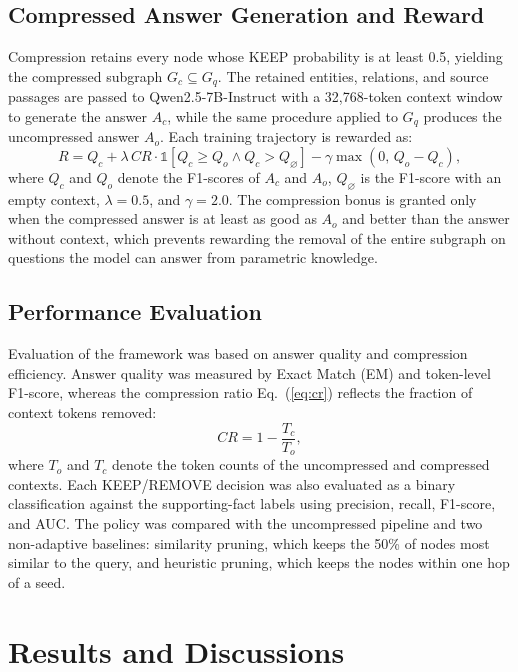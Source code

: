 \documentclass[conference]{IEEEtran}
\begin{document}
\subsection{Compressed Answer Generation and Reward}
Compression retains every node whose KEEP probability is at least 0.5, yielding the compressed subgraph $G_c \subseteq G_q$. The retained entities, relations, and source passages are passed to Qwen2.5-7B-Instruct with a 32,768-token context window to generate the answer $A_c$, while the same procedure applied to $G_q$ produces the uncompressed answer $A_o$. Each training trajectory is rewarded as:
\begin{equation}
    R = Q_c + \lambda\, CR \cdot \mathbb{1}\!\left[Q_c \ge Q_o \wedge Q_c > Q_{\varnothing}\right] - \gamma \max(0,\, Q_o - Q_c),
    \label{eq:reward}
\end{equation}
where $Q_c$ and $Q_o$ denote the F1-scores of $A_c$ and $A_o$, $Q_{\varnothing}$ is the F1-score with an empty context, $\lambda=0.5$, and $\gamma=2.0$. The compression bonus is granted only when the compressed answer is at least as good as $A_o$ and better than the answer without context, which prevents rewarding the removal of the entire subgraph on questions the model can answer from parametric knowledge.

\subsection{Performance Evaluation}
Evaluation of the framework was based on answer quality and compression efficiency. Answer quality was measured by Exact Match (EM) and token-level F1-score, whereas the compression ratio Eq.~(\ref{eq:cr}) reflects the fraction of context tokens removed:
\begin{equation}
    CR = 1 - \frac{T_c}{T_o},
    \label{eq:cr}
\end{equation}
where $T_o$ and $T_c$ denote the token counts of the uncompressed and compressed contexts. Each KEEP/REMOVE decision was also evaluated as a binary classification against the supporting-fact labels using precision, recall, F1-score, and AUC. The policy was compared with the uncompressed pipeline and two non-adaptive baselines: similarity pruning, which keeps the 50\% of nodes most similar to the query, and heuristic pruning, which keeps the nodes within one hop of a seed.

\section{Results and Discussions}\label{sec:ERD}
\end{document}
